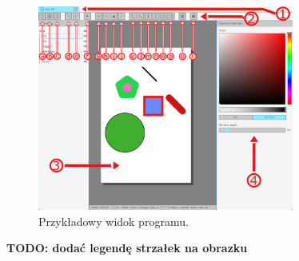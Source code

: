 \documentclass[a4paper,12pt]{article}
\begin{document}
\begin{figure}[h!]
    \centering
    \includegraphics[width=0.75\textwidth]{./vecedit_screenshot.png}
    \caption{Przykładowy widok programu.}
    \label{fig:screenshot}
\end{figure}

\noindent \textbf{TODO: dodać legendę strzałek na obrazku}
\end{document}
